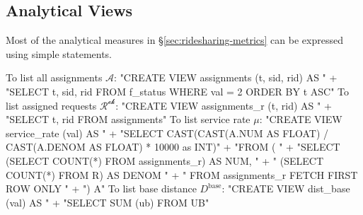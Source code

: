 \subsection{Analytical Views}
Most of the analytical measures in \S\ref{sec:ridesharing-metrics} can
be expressed using simple statements.

To list all assignments $\mathcal{A}$:
\nwenddocs{}\endmoddef{}
"CREATE VIEW assignments (t, sid, rid) AS "
  + "SELECT t, sid, rid FROM f_status WHERE val = 2 ORDER BY t ASC"
\nwendcode{}\nwdocspar
To list assigned requests $\mathcal{R^\textrm{ok}}$:
\nwenddocs{}\endmoddef{}
"CREATE VIEW assignments_r (t, rid) AS "
  + "SELECT t, rid FROM assignments"
\nwendcode{}\nwdocspar
To list service rate $\mu$:
\nwenddocs{}\endmoddef{}
"CREATE VIEW service_rate (val) AS "
  + "SELECT CAST(CAST(A.NUM AS FLOAT) / CAST(A.DENOM AS FLOAT) * 10000 as INT)"
  + "FROM ( "
  + "SELECT (SELECT COUNT(*) FROM assignments_r) AS NUM, "
  + "       (SELECT COUNT(*) FROM R) AS DENOM "
  + "       FROM assignments_r FETCH FIRST ROW ONLY "
  + ") A"
\nwendcode{}\nwdocspar
To list base distance $D^\textrm{base}$:
\nwenddocs{}\endmoddef{}
"CREATE VIEW dist_base (val) AS "
  + "SELECT SUM (ub) FROM UB"
\nwendcode{}

